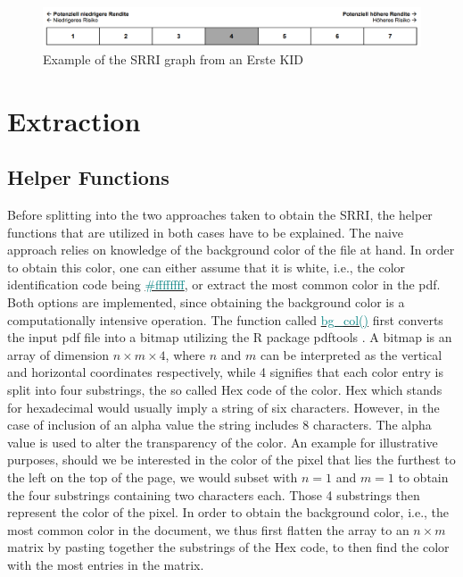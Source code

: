 \documentclass[aodsor,preprint]{imsart}
\numberwithin{equation}{section}
\theoremstyle{plain}
\begin{document}
\begin{figure}[H]
	\includegraphics[width = 12cm]{example_SRRI_graph}
	\caption{Example of the SRRI graph from an Erste KID}
\end{figure}


\section{Extraction}

\subsection{Helper Functions}
Before splitting into the two approaches taken to obtain the SRRI, the helper functions that are utilized in both cases have to be explained. The naive approach relies on knowledge of the background color of the file at hand. In order to obtain this color, one can either assume that it is white, i.e., the color identification code being \href{https://www.color-hex.com/color/ffffff}{\textcolor{teal}{\#ffffffff}}, or extract the most common color in the pdf. Both options are implemented, since obtaining the background color is a computationally intensive operation. The function called  \href{https://github.com/Base-R-Best-R/KID/blob/main/Code/Package/KIDs/R/bg_col.R}{\textcolor{teal}{bg\_col()}} first converts the input pdf file into a bitmap utilizing the R package pdftools \citep{pdftools}. A bitmap is an array of dimension $n \times m \times 4$, where $n$ and $m$ can be interpreted as the vertical and horizontal coordinates respectively, while 4 signifies that each color entry is split into four substrings, the so called Hex code of the color. Hex which stands for hexadecimal would usually imply a string of six characters. However, in the case of inclusion of an alpha value the string includes 8 characters. The alpha value is used to alter the transparency of the color. An example for illustrative purposes, should we be interested in the color of the pixel that lies the furthest to the left on the top of the page, we would subset with $n = 1$ and $m = 1$ to obtain the four substrings containing two characters each. Those 4 substrings then represent the color of the pixel. In order to obtain the background color, i.e., the most common color in the document, we thus first flatten the array to an $n\times m$ matrix by pasting together the substrings of the Hex code, to then find the color with the most entries in the matrix.\\
\end{document}
